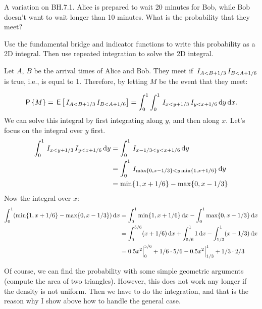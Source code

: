 \documentclass[lectures-questions]{subfiles}
\begin{document}
\begin{exercise}
A variation on BH.7.1. Alice is prepared to wait 20 minutes for Bob, while Bob doesn't want to wait longer than 10 minutes. What is the probability that they meet?

Use the fundamental bridge and indicator functions to write this probability as a 2D integral. Then use repeated integration to solve the 2D integral.
\begin{solution}
Let $A$, $B$ be the arrival times of Alice and Bob. They meet if $\,I_{A<B+1/3}\,I_{B<A+1/6}$ is true, i.e., is equal to 1. Therefore, by letting $M$ be the event that they meet:

\begin{equation*}
\,\mathsf{P}\left\{M\right\} = \,\mathsf{E}\left[\,I_{A<B+1/3}\,I_{B<A+1/6}\right] = \int_0^1\int_0^1 \,I_{x<y+1/3}\,I_{y<x+1/6} \,\textrm{d}y \,\textrm{d}x.
\end{equation*}
We can solve this integral by first integrating along $y$, and then along $x$. Let's focus on the integral over $y$ first.
\begin{align*}
\int_0^1 \,I_{x<y+1/3}\,I_{y<x+1/6} \,\textrm{d}y
&=\int_0^1 \,I_{x-1/3<y<x+1/6} \,\textrm{d}y \\
&=\int_0^1 \,I_{\max\{0, x-1/3\} <y \min\{1,x+1/6\} } \,\textrm{d}y \\
&= \min\{1,x+1/6\} - \max\{0, x-1/3\}
\end{align*}
Now the integral over $x$:
\begin{align*}
  \int_0^1 (\min\{1,x+1/6\} - \max\{0, x-1/3\}) \,\textrm{d}x
&=  \int_0^1 \min\{1,x+1/6\}\,\textrm{d}x - \int_0^{1}\max\{0, x-1/3\} \,\textrm{d}x  \\
&=  \int_0^{5/6}(x+1/6)\,\textrm{d}x + \int_{5/6}^{1}1 \,\textrm{d}x
 - \int_{1/3}^{1}(x-1/3) \,\textrm{d}x \\
  &=0.5 x^2\Big|_{0}^{5/6} + 1/6\cdot 5/6 - 0.5x^2\Big|_{1/3}^1 + 1/3\cdot 2/3
\end{align*}

Of course, we can find the probability with some simple geometric arguments (compute the area of two triangles). However, this does not work any longer if the density is not uniform.  Then we have to do the integration, and that is the reason why I show above how to handle the general case.
\end{solution}


\end{exercise}
\end{document}
